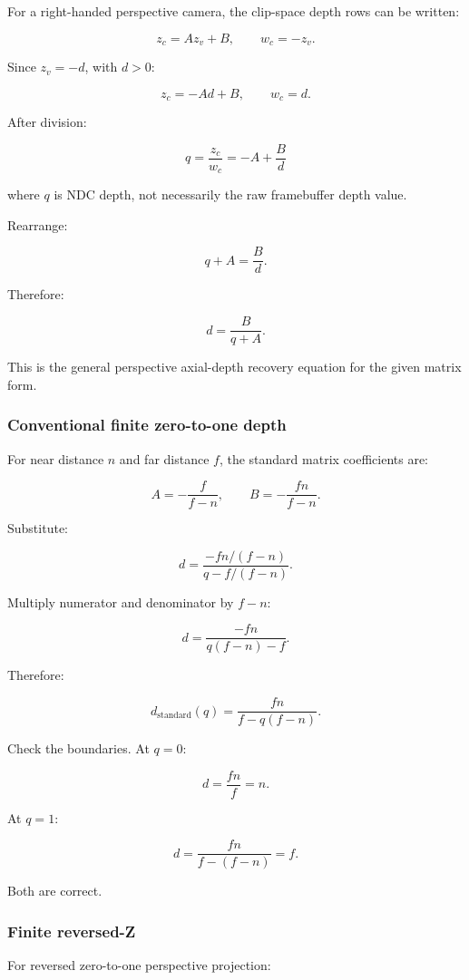 For a right-handed perspective camera, the clip-space depth rows can be written:

\[ z_c=Az_v+B, \qquad w_c=-z_v. \]

Since \(z_v=-d\), with \(d>0\):

\[ z_c=-Ad+B, \qquad w_c=d. \]

After division:

\[ \boxed{ q=\frac{z_c}{w_c}=-A+\frac Bd } \]

where \(q\) is NDC depth, not necessarily the raw framebuffer depth value.

Rearrange:

\[ q+A=\frac Bd. \]

Therefore:

\[ \boxed{ d=\frac B{q+A}. } \]

This is the general perspective axial-depth recovery equation for the given matrix form.

\subsubsection{Conventional finite zero-to-one depth}\label{conventional-finite-zero-to-one-depth}

For near distance \(n\) and far distance \(f\), the standard matrix coefficients are:

\[ A=-\frac f{f-n}, \qquad B=-\frac{fn}{f-n}. \]

Substitute:

\[ d= \frac{-fn/(f-n)} {q-f/(f-n)}. \]

Multiply numerator and denominator by \(f-n\):

\[ d=\frac{-fn}{q(f-n)-f}. \]

Therefore:

\[ \boxed{ d_{\mathrm{standard}}(q) = \frac{fn}{f-q(f-n)}. } \]

Check the boundaries. At \(q=0\):

\[ d=\frac{fn}{f}=n. \]

At \(q=1\):

\[ d=\frac{fn}{f-(f-n)}=f. \]

Both are correct.

\subsubsection{Finite reversed-Z}\label{finite-reversed-z}

For reversed zero-to-one perspective projection:

